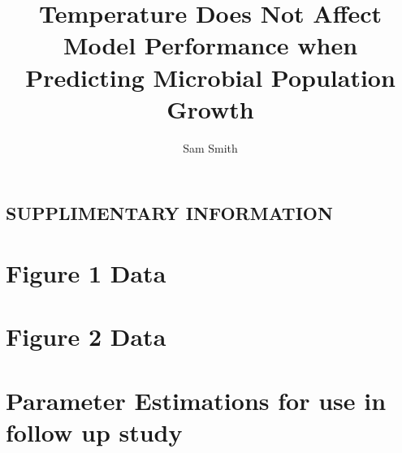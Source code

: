 \documentclass[12pt]{article}
\title{Temperature Does Not Affect Model Performance when Predicting Microbial Population Growth}
\author{Sam Smith}
\date{}
\begin{document}
\begin{titlepage}

    \maketitle
    \centering
    \section*{SUPPLIMENTARY INFORMATION}

\end{titlepage}
  
  \section{Figure 1 Data \cite{Roth1962}}
  \begin{table}[h]
    \centering
  \end{table}
\clearpage
  \section{Figure 2 Data}
  \begin{table}[h]
    \centering
  \end{table}
\clearpage
  \section{Parameter Estimations for use in follow up study}
  \begin{table}
  \end{table}
  \begin{table}
  \end{table}
  \begin{table}
  \end{table}
  \begin{table}
  \end{table}
  \begin{table}
  \end{table}
  \clearpage
  
  
  
\end{document}
